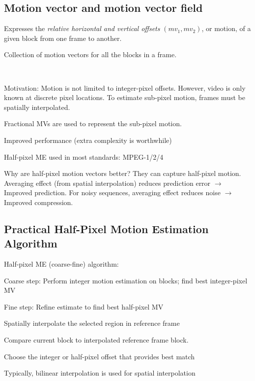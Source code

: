 \begin{compactdesc}
\section{Motion vector and motion vector field}
	\item[\lp{Motion vector}] Expresses the \emph{relative horizontal and vertical offsets} $(mv_1,mv_2)$, or motion, of a given block from one frame to another.
	\item[\lp{Motion vector field}] Collection of motion vectors for all the blocks in a frame.
	\item[\lp{Example of fast motion estimation search}]
\item[\lp{Motion Vector Presision}]\hfill\\
\begin{itemize*}[label=\colorbullet]
	\item Motivation: Motion is not limited to integer-pixel offsets. However, video is only known at discrete pixel locations. To estimate sub-pixel motion, frames must be spatially interpolated.\\
	\item Fractional MVs are used to represent the sub-pixel motion.\\
	\item Improved performance (extra complexity is worthwhile)\\
	\item Half-pixel ME used in most standards: MPEG-1/2/4\\
	\item Why are half-pixel motion vectors better? They can capture half-pixel motion. Averaging effect (from spatial interpolation) reduces prediction error $\to$ Improved prediction. For noisy sequences, averaging effect reduces noise $\to$ Improved compression.
\end{itemize*}
\subsection{Practical Half-Pixel Motion Estimation Algorithm}
Half-pixel ME (coarse-fine) algorithm:
\begin{enumerate*}[label=\protect\circled{\arabic*},itemjoin=]
	\item Coarse step: Perform integer motion estimation on blocks; find best integer-pixel MV\\
	\item Fine step: Refine estimate to find best half-pixel MV\\
		\begin{enumerate*}[label=\protect\circled{\alph*},itemjoin=]
			\item Spatially interpolate the selected region in reference frame\\
			\item Compare current block to interpolated reference frame block.\\
			\item Choose the integer or half-pixel offset that provides best match
		\end{enumerate*}
\end{enumerate*}
Typically, bilinear interpolation is used for spatial interpolation

\end{compactdesc}
